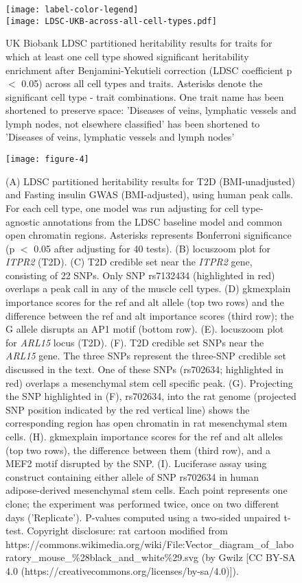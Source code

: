 \documentclass{article}
\begin{document}
\begin{figure}
	\texttt{[image: label-color-legend]}\\
\texttt{[image: LDSC-UKB-across-all-cell-types.pdf]}
	\caption{UK Biobank LDSC partitioned heritability results for traits for which at least one cell type showed significant heritability enrichment after Benjamini-Yekutieli correction (LDSC coefficient p $<$ 0.05) across all cell types and traits. Asterisks denote the significant cell type - trait combinations. One trait name has been shortened to preserve space: 'Diseases of veins, lymphatic vessels and lymph nodes, not elsewhere classified' has been shortened to 'Diseases of veins, lymphatic vessels and lymph nodes'}
\end{figure}

\begin{figure}
\texttt{[image: figure-4]}
	\caption{(A) LDSC partitioned heritability results for T2D (BMI-unadjusted) and Fasting insulin GWAS (BMI-adjusted), using human peak calls. For each cell type, one model was run adjusting for cell type-agnostic annotations from the LDSC baseline model and common open chromatin regions. Asterisks represents Bonferroni significance (p $<$ 0.05 after adjusting for 40 tests). (B) locuszoom plot for \textit{ITPR2} (T2D). (C) T2D credible set near the \textit{ITPR2} gene, consisting of 22 SNPs. Only SNP rs7132434 (highlighted in red) overlaps a peak call in any of the muscle cell types. (D) gkmexplain importance scores for the ref and alt allele (top two rows) and the difference between the ref and alt importance scores (third row); the G allele disrupts an AP1 motif (bottom row). (E). locuszoom plot for \textit{ARL15} locus (T2D). (F). T2D credible set SNPs near the \textit{ARL15} gene. The three SNPs represent the three-SNP credible set discussed in the text. One of these SNPs (rs702634; highlighted in red) overlaps a mesenchymal stem cell specific peak. (G). Projecting the SNP highlighted in (F), rs702634, into the rat genome (projected SNP position indicated by the red vertical line) shows the corresponding region has open chromatin in rat mesenchymal stem cells. (H). gkmexplain importance scores for the ref and alt alleles (top two rows), the difference between them (third row), and a MEF2 motif disrupted by the SNP. (I). Luciferase assay using construct containing either allele of SNP rs702634 in human adipose-derived mesenchymal stem cells. Each point represents one clone; the experiment was performed twice, once on two different days ('Replicate'). P-values computed using a two-sided unpaired t-test. Copyright disclosure: rat cartoon modified from https://commons.wikimedia.org/wiki/File:Vector\_diagram\_of\_laboratory\_mouse\_\%28black\_and\_white\%29.svg (by Gwilz [CC BY-SA 4.0 (https://creativecommons.org/licenses/by-sa/4.0)]).}
\end{figure}
\end{document}
